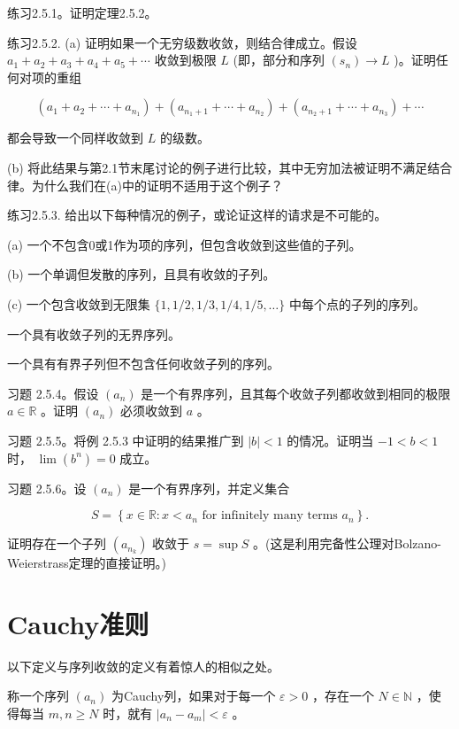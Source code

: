 练习2.5.1。证明定理2.5.2。

练习2.5.2. (a) 证明如果一个无穷级数收敛，则结合律成立。假设 \({a}_{1} + {a}_{2} + {a}_{3} + {a}_{4} + {a}_{5} + \cdots\) 收敛到极限 \(L\) (即，部分和序列 \(\left( {s}_{n}\right)  \rightarrow  L\) )。证明任何对项的重组

\[
\left( {{a}_{1} + {a}_{2} + \cdots  + {a}_{{n}_{1}}}\right)  + \left( {{a}_{{n}_{1} + 1} + \cdots  + {a}_{{n}_{2}}}\right)  + \left( {{a}_{{n}_{2} + 1} + \cdots  + {a}_{{n}_{3}}}\right)  + \cdots
\]

都会导致一个同样收敛到 \(L\) 的级数。

(b) 将此结果与第2.1节末尾讨论的例子进行比较，其中无穷加法被证明不满足结合律。为什么我们在(a)中的证明不适用于这个例子？

练习2.5.3. 给出以下每种情况的例子，或论证这样的请求是不可能的。

(a) 一个不包含0或1作为项的序列，但包含收敛到这些值的子列。

(b) 一个单调但发散的序列，且具有收敛的子列。

(c) 一个包含收敛到无限集 \(\{ 1,1/2,1/3,1/4,1/5,\ldots \}\) 中每个点的子列的序列。

一个具有收敛子列的无界序列。

一个具有有界子列但不包含任何收敛子列的序列。

习题 2.5.4。假设 \(\left( {a}_{n}\right)\) 是一个有界序列，且其每个收敛子列都收敛到相同的极限 \(a \in  \mathbb{R}\) 。证明 \(\left( {a}_{n}\right)\) 必须收敛到 \(a\) 。

习题 2.5.5。将例 2.5.3 中证明的结果推广到 \(\left| b\right|  < 1\) 的情况。证明当 \(- 1 < b < 1\) 时， \(\lim \left( {b}^{n}\right)  = 0\) 成立。

习题 2.5.6。设 \(\left( {a}_{n}\right)\) 是一个有界序列，并定义集合

\[
S = \left\{  {x \in  \mathbb{R} : x < {a}_{n}\text{ for infinitely many terms }{a}_{n}}\right\}  .
\]

证明存在一个子列 \(\left( {a}_{{n}_{k}}\right)\) 收敛于 \(s = \sup S\) 。(这是利用完备性公理对Bolzano-Weierstrass定理的直接证明。)

\section{Cauchy准则}
\label{sec:2.6}
以下定义与序列收敛的定义有着惊人的相似之处。

\begin{Def}
  \label{def:2.6.1}
  称一个序列 \(\left( {a}_{n}\right)\) 为Cauchy列，如果对于每一个 \(\varepsilon  > 0\) ，存在一个 \(N \in  \mathbb{N}\) ，使得每当 \(m,n \geq  N\) 时，就有 \(\left| {{a}_{n} - {a}_{m}}\right|  < \varepsilon\) 。
\end{Def}


